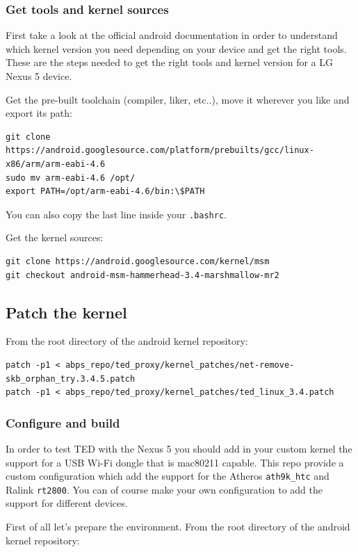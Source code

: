 \documentclass[a4paper]{article}
\begin{document}
\subsubsection{Get tools and kernel sources}
First take a look at the official android
documentation\cite{androidkernel} in order to understand
which kernel version you need depending on your device and get the right
tools.
These are the steps needed to get the right tools and kernel version for 
a LG Nexus 5 device.

Get the pre-built toolchain (compiler, liker, etc..), move it wherever you like and export its path:
\begin{lstlisting}
git clone https://android.googlesource.com/platform/prebuilts/gcc/linux-x86/arm/arm-eabi-4.6
sudo mv arm-eabi-4.6 /opt/
export PATH=/opt/arm-eabi-4.6/bin:\$PATH
\end{lstlisting}
You can also copy the last line inside your \texttt{.bashrc}.

Get the kernel sources:

\begin{lstlisting}
git clone https://android.googlesource.com/kernel/msm
git checkout android-msm-hammerhead-3.4-marshmallow-mr2
\end{lstlisting}

\subsection{Patch the kernel}
From the root directory of the android kernel repository:

\begin{lstlisting}
patch -p1 < abps_repo/ted_proxy/kernel_patches/net-remove-skb_orphan_try.3.4.5.patch
patch -p1 < abps_repo/ted_proxy/kernel_patches/ted_linux_3.4.patch
\end{lstlisting}

\subsubsection{Configure and build}
In order to test TED with the Nexus 5 you should add in your custom kernel the
 support for a USB Wi-Fi dongle that is mac80211 capable. This repo provide a 
custom configuration which add the support for the Atheros
\texttt{ath9k\_htc} and Ralink \texttt{rt2800}.
You can of course make your own configuration to add the support for different devices.

First of all let's prepare the environment. From the root directory of the android kernel repository:
\end{document}
